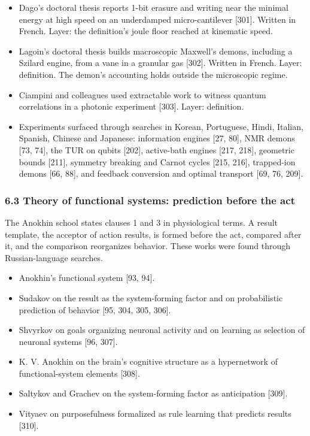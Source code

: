 \documentclass[
  10pt,
]{article}
\providecommand{\tightlist}{%
  \setlength{\itemsep}{0pt}\setlength{\parskip}{0pt}}
\begin{document}
\begin{itemize}
\tightlist
\item
  Dago's doctoral thesis reports 1-bit erasure and writing near the
  minimal energy at high speed on an underdamped micro-cantilever
  {[}301{]}. Written in French. Layer: the definition's joule floor
  reached at kinematic speed.
\item
  Lagoin's doctoral thesis builds macroscopic Maxwell's demons,
  including a Szilard engine, from a vane in a granular gas {[}302{]}.
  Written in French. Layer: definition. The demon's accounting holds
  outside the microscopic regime.
\item
  Ciampini and colleagues used extractable work to witness quantum
  correlations in a photonic experiment {[}303{]}. Layer: definition.
\item
  Experiments surfaced through searches in Korean, Portuguese, Hindi,
  Italian, Spanish, Chinese and Japanese: information engines {[}27,
  80{]}, NMR demons {[}73, 74{]}, the TUR on qubits {[}202{]},
  active-bath engines {[}217, 218{]}, geometric bounds {[}211{]},
  symmetry breaking and Carnot cycles {[}215, 216{]}, trapped-ion demons
  {[}66, 88{]}, and feedback conversion and optimal transport {[}69, 76,
  209{]}.
\end{itemize}

\subsubsection{6.3 Theory of functional systems: prediction before the
act}\label{theory-of-functional-systems-prediction-before-the-act}

The Anokhin school states clauses 1 and 3 in physiological terms. A
result template, the acceptor of action results, is formed before the
act, compared after it, and the comparison reorganizes behavior. These
works were found through Russian-language searches.

\begin{itemize}
\tightlist
\item
  Anokhin's functional system {[}93, 94{]}.
\item
  Sudakov on the result as the system-forming factor and on
  probabilistic prediction of behavior {[}95, 304, 305, 306{]}.
\item
  Shvyrkov on goals organizing neuronal activity and on learning as
  selection of neuronal systems {[}96, 307{]}.
\item
  K. V. Anokhin on the brain's cognitive structure as a hypernetwork of
  functional-system elements {[}308{]}.
\item
  Saltykov and Grachev on the system-forming factor as anticipation
  {[}309{]}.
\item
  Vityaev on purposefulness formalized as rule learning that predicts
  results {[}310{]}.
\end{itemize}
\end{document}
